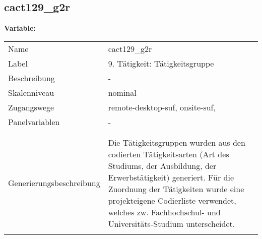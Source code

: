 	
	
	\subsection{cact129\_g2r}
	\label{subSection:cact129_g2r}

	\noindent\textbf{Variable:}\\
		\begin{tabular}{lL{11.3cm}}
			\label{tableVariable:cact129_g2r}
			Name & cact129\_g2r \\
			Label & 9. Tätigkeit: Tätigkeitsgruppe  \\
			Beschreibung & - \\
			Skalenniveau & nominal \\
			Zugangswege &
				remote-desktop-suf,
				onsite-suf,
 \\
			Panelvariablen & -
			 \\
			 \\
 \\
					Generierungsbeschreibung & Die Tätigkeitsgruppen wurden aus den codierten Tätigkeitsarten (Art des Studiums, der Ausbildung, der Erwerbstätigkeit) generiert. Für die Zuordnung der Tätigkeiten wurde eine projekteigene Codierliste verwendet, welches zw. Fachhochschul- und Universitäts-Studium unterscheidet.
				 \\	
			 \\
		\end{tabular}







